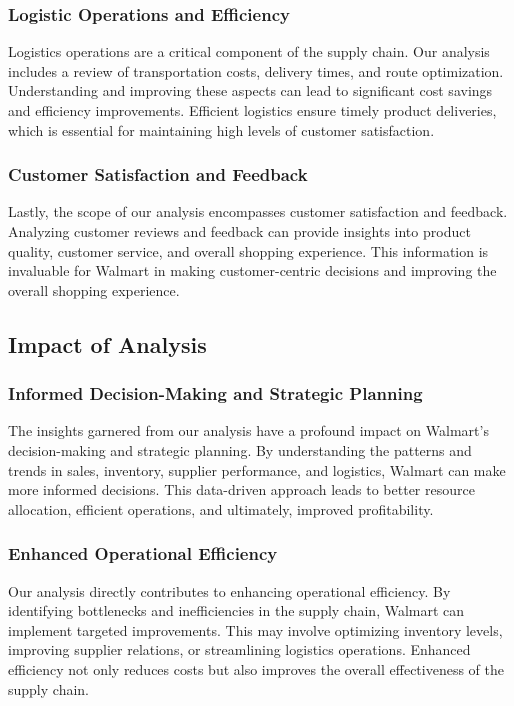 \documentclass[conference]{IEEEtran}
\begin{document}
\subsubsection{Logistic Operations and Efficiency}
Logistics operations are a critical component of the supply chain. Our analysis includes a review of transportation costs, delivery times, and route optimization. Understanding and improving these aspects can lead to significant cost savings and efficiency improvements. Efficient logistics ensure timely product deliveries, which is essential for maintaining high levels of customer satisfaction.

\subsubsection{Customer Satisfaction and Feedback}
Lastly, the scope of our analysis encompasses customer satisfaction and feedback. Analyzing customer reviews and feedback can provide insights into product quality, customer service, and overall shopping experience. This information is invaluable for Walmart in making customer-centric decisions and improving the overall shopping experience.

\subsection{Impact of Analysis}
\subsubsection{Informed Decision-Making and Strategic Planning}
The insights garnered from our analysis have a profound impact on Walmart's decision-making and strategic planning. By understanding the patterns and trends in sales, inventory, supplier performance, and logistics, Walmart can make more informed decisions. This data-driven approach leads to better resource allocation, efficient operations, and ultimately, improved profitability.

\subsubsection{Enhanced Operational Efficiency}
Our analysis directly contributes to enhancing operational efficiency. By identifying bottlenecks and inefficiencies in the supply chain, Walmart can implement targeted improvements. This may involve optimizing inventory levels, improving supplier relations, or streamlining logistics operations. Enhanced efficiency not only reduces costs but also improves the overall effectiveness of the supply chain.
\end{document}
